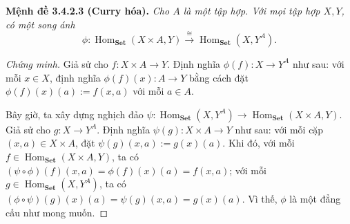 \noindent\textbf{Mệnh đề 3.4.2.3 (Curry hóa).} \emph{Cho $A$ là một tập hợp. Với mọi tập hợp $X,Y$, có một song ánh}
\begin{equation*}\phi:\operatorname{Hom}_{\mathbf{Set}}(X\times A,Y)\xrightarrow{\cong}\operatorname{Hom}_{\mathbf{Set}}(X,Y^A).\tag{3.22}\end{equation*}
\begin{proof}[Chứng minh]
Giả sử cho $f:X\times A\to Y$. Định nghĩa $\phi(f):X\to Y^A$ như sau: với mỗi $x\in X$, định nghĩa $\phi(f)(x):A\to Y$ bằng cách đặt $\phi(f)(x)(a):=f(x,a)$ với mỗi $a\in A$.

Bây giờ, ta xây dựng nghịch đảo $\psi:\operatorname{Hom}_{\mathbf{Set}}(X,Y^A)\to\operatorname{Hom}_{\mathbf{Set}}(X\times A,Y)$. Giả sử cho $g:X\to Y^A$. Định nghĩa $\psi(g):X\times A\to Y$ như sau: với mỗi cặp $(x,a)\in X\times A$, đặt $\psi(g)(x,a):=g(x)(a)$.
Khi đó, với mỗi $f\in\operatorname{Hom}_{\mathbf{Set}}(X\times A,Y)$, ta có $(\psi\circ\phi)(f)(x,a)=\phi(f)(x)(a)=f(x,a)$; với mỗi $g\in\operatorname{Hom}_{\mathbf{Set}}(X,Y^A)$, ta có $(\phi\circ\psi)(g)(x)(a)=\psi(g)(x,a)=g(x)(a)$. Vì thế, $\phi$ là một đẳng cấu như mong muốn.
\end{proof}

